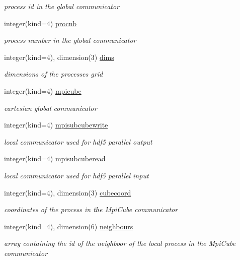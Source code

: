 \begin{DoxyCompactItemize}
\begin{DoxyCompactList}\small\item\em process id in the global communicator \end{DoxyCompactList}\item 
integer(kind=4) \hyperlink{namespacemodmpicom_a5e40853b0f15e4c14658ea56fb1b9b73}{procnb}
\begin{DoxyCompactList}\small\item\em process number in the global communicator \end{DoxyCompactList}\item 
integer(kind=4), dimension(3) \hyperlink{namespacemodmpicom_a8762b65024b222a0c5bfab4f8af21d7d}{dims}
\begin{DoxyCompactList}\small\item\em dimensions of the processes grid \end{DoxyCompactList}\item 
integer(kind=4) \hyperlink{namespacemodmpicom_a85f71373d318b169e73b6a0221dc62f1}{mpicube}
\begin{DoxyCompactList}\small\item\em cartesian global communicator \end{DoxyCompactList}\item 
integer(kind=4) \hyperlink{namespacemodmpicom_aa950234af9f6bdf930d8c4e61a76ca96}{mpisubcubewrite}
\begin{DoxyCompactList}\small\item\em local communicator used for hdf5 parallel output \end{DoxyCompactList}\item 
integer(kind=4) \hyperlink{namespacemodmpicom_afee5305bd782226daffc69f8db2af8a7}{mpisubcuberead}
\begin{DoxyCompactList}\small\item\em local communicator used for hdf5 parallel input \end{DoxyCompactList}\item 
integer(kind=4), dimension(3) \hyperlink{namespacemodmpicom_a533718abb8ce3f03b430dfbf9f821069}{cubecoord}
\begin{DoxyCompactList}\small\item\em coordinates of the process in the Mpi\+Cube communicator \end{DoxyCompactList}\item 
integer(kind=4), dimension(6) \hyperlink{namespacemodmpicom_a818e6dbfc3705e5d5bddb752f2aeb5aa}{neighbours}
\begin{DoxyCompactList}\small\item\em array containing the id of the neighboor of the local process in the Mpi\+Cube communicator \end{DoxyCompactList}\item 

\end{DoxyCompactItemize}
